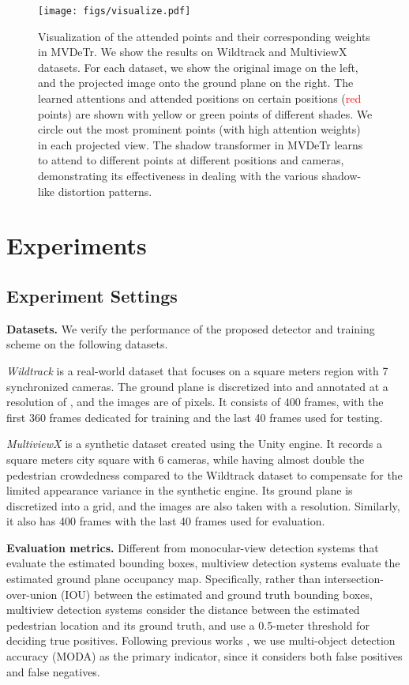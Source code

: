 \documentclass[sigconf,authorversion,nonacm]{acmart}
\begin{document}
\begin{figure*}[h]
  \centering
  \texttt{[image: figs/visualize.pdf]}
  \caption{Visualization of the attended points and their corresponding weights in MVDeTr. We show the results on Wildtrack and MultiviewX datasets. For each dataset, we show the original image on the left, and the projected image onto the ground plane on the right. The learned attentions and attended positions on certain positions (\textcolor{red}{red} points) are shown with \textcolor{myyellow}{yellow} or \textcolor{mygreen}{green} points of different shades. We circle out the most prominent points (with high attention weights) in each projected view. The shadow transformer in MVDeTr learns to attend to different points at different positions and cameras, demonstrating its effectiveness in dealing with the various shadow-like distortion patterns. 
  }
  \label{fig:visual}
\end{figure*}





\section{Experiments}
\subsection{Experiment Settings}
\textbf{Datasets.} We verify the performance of the proposed detector and training scheme on the following datasets.

\textit{Wildtrack} \cite{chavdarova2018wildtrack} is a real-world dataset that focuses on a  square meters region with 7 synchronized cameras. The ground plane is discretized into and annotated at a resolution of , and the images are of  pixels. It consists of 400 frames, with the first 360 frames dedicated for training and the last 40 frames used for testing. 

\textit{MultiviewX} \cite{hou2020multiview} is a synthetic dataset created using the Unity \cite{unity} engine. It records a  square meters city square with 6 cameras, while having almost double the pedestrian crowdedness compared to the Wildtrack dataset to compensate for the limited appearance variance in the synthetic engine. Its ground plane is discretized into a  grid, and the images are also taken with a  resolution. Similarly, it also has 400 frames with the last 40 frames used for evaluation. 

\textbf{Evaluation metrics.}
Different from monocular-view detection systems that evaluate the estimated bounding boxes, multiview detection systems evaluate the estimated ground plane occupancy map. Specifically, rather than intersection-over-union (IOU) between the estimated and ground truth bounding boxes, multiview detection systems consider the distance between the estimated pedestrian location and its ground truth, and use a 0.5-meter threshold for deciding true positives. 
Following previous works \cite{chavdarova2018wildtrack,hou2020multiview}, we use multi-object detection accuracy (MODA) as the primary indicator, since it considers both false positives and false negatives. 
\end{document}
